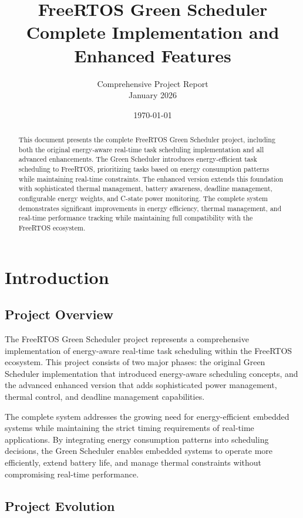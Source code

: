 \documentclass[11pt,a4paper]{article}
\title{\textbf{FreeRTOS Green Scheduler} \\ Complete Implementation and Enhanced Features}
\author{Comprehensive Project Report \\ January 2026}
\date{\today}
\begin{document}
\maketitle

\begin{abstract}
This document presents the complete FreeRTOS Green Scheduler project, including both the original energy-aware real-time task scheduling implementation and all advanced enhancements. The Green Scheduler introduces energy-efficient task scheduling to FreeRTOS, prioritizing tasks based on energy consumption patterns while maintaining real-time constraints. The enhanced version extends this foundation with sophisticated thermal management, battery awareness, deadline management, configurable energy weights, and C-state power monitoring. The complete system demonstrates significant improvements in energy efficiency, thermal management, and real-time performance tracking while maintaining full compatibility with the FreeRTOS ecosystem.
\end{abstract}

\tableofcontents
\newpage

\section{Introduction}

\subsection{Project Overview}
The FreeRTOS Green Scheduler project represents a comprehensive implementation of energy-aware real-time task scheduling within the FreeRTOS ecosystem. This project consists of two major phases: the original Green Scheduler implementation that introduced energy-aware scheduling concepts, and the advanced enhanced version that adds sophisticated power management, thermal control, and deadline management capabilities.

The complete system addresses the growing need for energy-efficient embedded systems while maintaining the strict timing requirements of real-time applications. By integrating energy consumption patterns into scheduling decisions, the Green Scheduler enables embedded systems to operate more efficiently, extend battery life, and manage thermal constraints without compromising real-time performance.

\subsection{Project Evolution}
\end{document}
